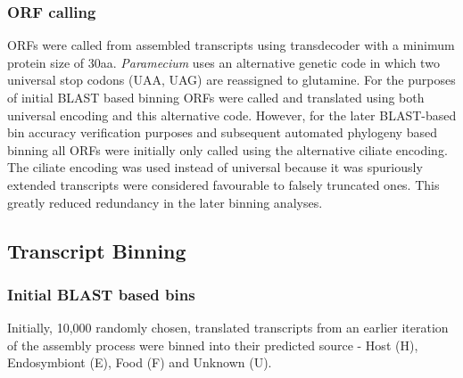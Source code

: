 \subsubsection{ORF calling}

ORFs were called from assembled transcripts using transdecoder \citep{Haas2013} with 
a minimum protein size of 30aa.  \textit{Paramecium} uses an alternative
genetic code in which two universal stop codons (UAA, UAG) are reassigned to glutamine.
For the purposes of initial BLAST based binning ORFs were called and translated
using both universal encoding and this alternative code. However, for 
the later BLAST-based bin accuracy verification purposes and subsequent
automated phylogeny based binning all ORFs were initially only called using 
the alternative ciliate encoding. The ciliate encoding was used
instead of universal because it was spuriously extended transcripts
were considered favourable to falsely truncated ones.
This greatly reduced redundancy in the later binning analyses.

\subsection{Transcript Binning}

\subsubsection{Initial BLAST based bins}

Initially, 10,000 randomly chosen, translated transcripts from an earlier iteration
of the assembly process were binned into their predicted source - 
Host (H), Endosymbiont (E), Food (F) and Unknown (U).  


